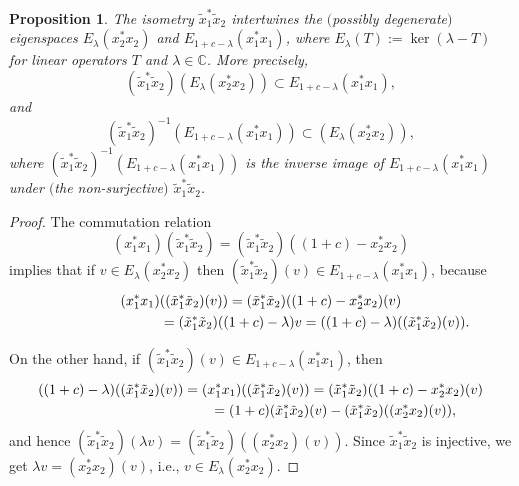 \documentclass[11pt]{article}
\numberwithin{equation}{section}
\newtheorem{proposition}{Proposition}
\begin{document}
\begin{proposition}\label{eigen-intertwine} The isometry $\tilde{x}_{1}^{\ast}\tilde{x}_{2}$
intertwines the $($possibly degenerate$)$ eigenspaces $E_{\lambda}(
x_{2}^{\ast}x_{2}) $ and $E_{1+c-\lambda}( x_{1}^{\ast}%
x_{1}) $, where $E_{\lambda}(T) :=\ker(\lambda-T) $ for linear operators $T$ and $\lambda\in\mathbb{C}$. More
precisely,
\[
( \tilde{x}_{1}^{\ast}\tilde{x}_{2}) ( E_{\lambda}(
x_{2}^{\ast}x_{2}) ) \subset E_{1+c-\lambda}( x_{1}^{\ast}x_{1}) ,
\]
and
\[
( \tilde{x}_{1}^{\ast}\tilde{x}_{2}) ^{-1}( E_{1+c-\lambda
}( x_{1}^{\ast}x_{1}) ) \subset( E_{\lambda}(x_{2}^{\ast}x_{2}) ),
\]
where $( \tilde{x}_{1}^{\ast}\tilde{x}_{2}) ^{-1}(
E_{1+c-\lambda}( x_{1}^{\ast}x_{1}) ) $ is the inverse
image of $E_{1+c-\lambda}( x_{1}^{\ast}x_{1}) $ under $($the
non-surjective$)$ $\tilde{x}_{1}^{\ast}\tilde{x}_{2}$.
\end{proposition}
\begin{proof} The commutation relation
\[
( x_{1}^{\ast}x_{1}) ( \tilde{x}_{1}^{\ast}\tilde{x}%
_{2}) =( \tilde{x}_{1}^{\ast}\tilde{x}_{2}) (
( 1+c) -x_{2}^{\ast}x_{2})
\]
implies that if $v\in E_{\lambda}( x_{2}^{\ast}x_{2}) $ then
$( \tilde{x}_{1}^{\ast}\tilde{x}_{2}) (v) \in
E_{1+c-\lambda}( x_{1}^{\ast}x_{1}) $, because
\begin{gather*}
( x_{1}^{\ast}x_{1}) ( ( \tilde{x}_{1}^{\ast}\tilde{x}_{2}) (v) ) =( \tilde{x}_{1}^{\ast
}\tilde{x}_{2}) ( ( 1+c) -x_{2}^{\ast}x_{2})(v)\\
\hphantom{( x_{1}^{\ast}x_{1}) ( ( \tilde{x}_{1}^{\ast}\tilde{x}_{2}) (v) )}{}
=( \tilde{x}_{1}^{\ast}\tilde{x}_{2}) ( ( 1+c)
-\lambda) v=( ( 1+c) -\lambda) (( \tilde{x}_{1}^{\ast}\tilde{x}_{2}) (v) ).
\end{gather*}

On the other hand, if $( \tilde{x}_{1}^{\ast}\tilde{x}_{2})(v) \in E_{1+c-\lambda}( x_{1}^{\ast}x_{1}) $, then
\begin{gather*}
( ( 1+c) -\lambda) ( ( \tilde{x}_{1}^{\ast}\tilde{x}_{2}) (v) ) =(
x_{1}^{\ast}x_{1}) ( ( \tilde{x}_{1}^{\ast}\tilde{x}%
_{2}) (v) ) =( \tilde{x}_{1}^{\ast}\tilde
{x}_{2}) ( ( 1+c) -x_{2}^{\ast}x_{2}) (v)\\
\hphantom{( ( 1+c) -\lambda) ( ( \tilde{x}_{1}^{\ast}\tilde{x}_{2}) (v) )}{}
=( 1+c) ( \tilde{x}_{1}^{\ast}\tilde{x}_{2}) (
v) -( \tilde{x}_{1}^{\ast}\tilde{x}_{2}) ( (
x_{2}^{\ast}x_{2}) (v) ),
\end{gather*}
and hence $( \tilde{x}_{1}^{\ast}\tilde{x}_{2}) ( \lambda
v) =( \tilde{x}_{1}^{\ast}\tilde{x}_{2}) ( (x_{2}^{\ast}x_{2}) (v) ) $. Since $\tilde{x}_{1}^{\ast}\tilde{x}_{2}$ is injective, we get $\lambda v=( x_{2}^{\ast}x_{2}) (v) $, i.e., $v\in E_{\lambda}( x_{2}^{\ast}x_{2}) $.
\end{proof}
\end{document}
